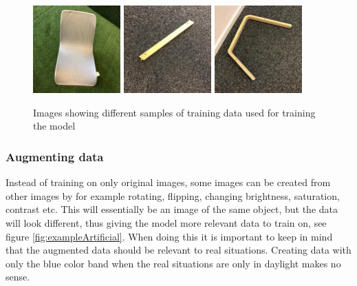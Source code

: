 \begin{figure}[hbtp]
\begin{center}
\includegraphics[width = 0.3\textwidth]{./Images/image_31.jpg}
\includegraphics[width = 0.3\textwidth]{./Images/image_133.jpg}
\includegraphics[width = 0.3\textwidth]{./Images/image_136.jpg}

\caption{Images showing different samples of training data used for training the model}
\label{fig:exampleData}
\end{center}
\end{figure}

\subsubsection{Augmenting data}
Instead of training on only original images, some images can be created from other images by for example rotating, flipping, changing brightness, saturation, contrast etc.  This will essentially be an image of the same object, but the data will look different, thus giving the model more relevant data to train on, see figure \ref{fig:exampleArtificial}.
When doing this it is important to keep in mind that the augmented data should be relevant to real situations.
Creating data with only the blue color band when the real situations are only in daylight makes no sense.

